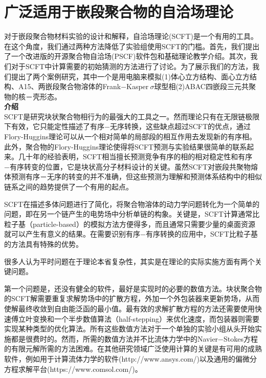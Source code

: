 \documentclass[12pt，a4paper]{article}
\title{}
\author{}
\date{\chntoday}
\numberwithin{equation}{section}
\begin{document}
\maketitle


\section{广泛适用于嵌段聚合物的自洽场理论}

对于嵌段聚合物材料实验的设计和解释，自洽场理论(SCFT)是一个有用的工具。在这个角度，我们通过两种方法降低了实验组使用SCFT的门槛。首先，我们提出了一个改进版的开源聚合物自洽场(PSCF)软件包和基础理论教学介绍。其次，我们对于SCFT中计算需要的初始猜测的方法进行了讨论。为了展示我们的方法，我们提出了两个案例研究，其中一个是用电脑来模拟(1)体心立方结构、面心立方结构、A15、两嵌段聚合物溶体的Frank−Kasper$~\sigma$球型相(2)ABAC四嵌段三元共聚物的核－壳形态。\\
\textbf{介绍}\\
SCFT是研究块状聚合物相行为的最强大的工具之一。然而理论只有在无限链极限下有效，它只能定性描述了有序−无序转换，这些缺点超过SCFT的优点，通过Flory-Huggins理论可以从一个相对简单的局部段的相互作用去发现新的有序相。此外，聚合物的Flory-Huggins理论使得将SCFT预测与实验结果很简单的联系起来。几十年的经验表明，SCFT相当擅长预测竞争有序的相的相对稳定性和有序−有序转变的位置，它是块状高分子材料设计的关键。虽然SCFT对嵌段共聚物熔体预测有序－无序的转变的并不准确，但这些预测为理解和预测体系结构中的相似链系之间的趋势提供了一个有用的起点。

SCFT在描述多体问题进行了简化，将聚合物溶体的动力学问题转化为一个简单的问题，即在另一个链产生的电势场中分析单链的构象。关键是，SCFT计算通常比粒子基（particle-based）的模拟方法方便得多，而且通常只需要少量的桌面资源就可以产生有意义的结果。在需要识别有序−有序转换的应用中，SCFT比粒子基的方法具有特殊的优势。

很多人认为平时问题在于理论本省复杂性，其实是在理论的实际实施方面有两个关键问题。

第一个问题是，还没有健全的软件，最好是实现时的必要的数值方法。块状聚合物的SCFT解需要重复求解势场中的扩散方程，外加一个外包装器来更新势场，从而使解最终收敛到自由能泛函的最小值。最有效的求解扩散方程的方法还需要使用快速傅立叶变换和一个半步数值算法（half-stepping）来优化速度，而包装器则需要实现某种类型的优化算法。所有这些数值方法对于一个单独的实验小组从头开始实施都是很费时的。然而，所需的数值方法并不比流体力学中的Navier−Stokes方程的有限元解所需的方法困难。在其他研究领域广泛使用计算的关键是有可用的成熟软件，例如用于计算流体力学的软件(http://www.ansys.com/)以及通用的偏微分方程求解平台(https://www.comsol.com/)。
\end{document}
